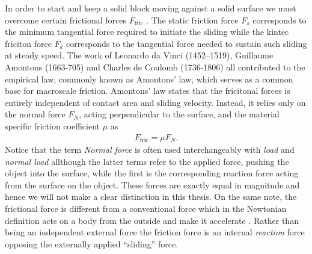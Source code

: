  In order to start and keep a solid block moving against a solid surface we must
 overcome certain frictional forces $F_{\text{fric}}$ \cite{gnecco_meyer_2015}.
 The static friction force $F_s$ corresponds to the minimum tangential force
 required to initiate the sliding while the kintec friciton force $F_k$
 corresponds to the tangential force needed to sustain such sliding at steady
 speed. The work of Leonardo da Vinci (1452–1519), Guillaume Amontons (1663-705)
 and Charles de Coulomb (1736-1806) all contributed to the empirical law,
 commonly known as Amontons’ law, which serves as a common base for macroscale
 friction. Amontons’ law states that the fricitonal forces is entirely
 independent of contact area and sliding velocity. Instead, it relies only on
 the normal force $F_N$, acting perpendicular to the surface, and the material specific friction coefficient $\mu$ as
\begin{align}
  F_{\text{fric}} = \mu F_N.
  \label{eq:amonton}
\end{align}
Notice that the term \textit{Normal force} is often used interchangeably
with \textit{load} and \textit{normal load} allthough the latter terms refer to the applied force, pushing the object into the surface, while the first is the corresponding reaction force acting from the surface on the object. These forces are exactly equal in magnitude and hence we will not make a clear distinction in this thesis. On the same note, the frictional force is different from a conventional force which in the Newtonian definition acts on a body from the outside and make it accelerate \cite{gao_frictional_2004}. Rather than being an independent external force the friction force is an internal \textit{reaction} force opposing the externally applied ``sliding'' force. 


